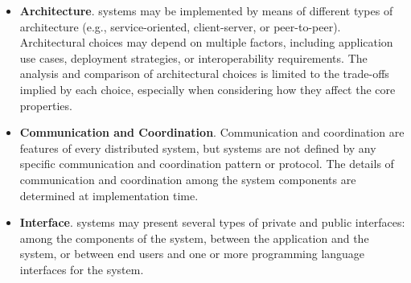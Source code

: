 \documentclass{sig-alternate}
\begin{document}
\begin{itemize}

\item \textbf{Architecture}. \pilot systems may be implemented by means of
  different types of architecture (e.g., service-oriented, client-server, or
  peer-to-peer). Architectural choices may depend on multiple factors, including
  application use cases, deployment strategies, or interoperability
  requirements.  The analysis and comparison of architectural choices is limited
  to the trade-offs implied by each choice, especially when considering how they
  affect the core properties.


    

\item \textbf{Communication and Coordination}. Communication and coordination
  are features of every distributed system, but \pilot systems are not defined
  by any specific communication and coordination pattern or protocol. The
  details of communication and coordination among the \pilot system components
  are determined at implementation time.




\item \textbf{Interface}. \pilot systems may present several types of private
  and public interfaces: among the components of the \pilot system, between the
  application and the \pilot system, or between end users and one or more
  programming language interfaces for the \pilot system.


\end{itemize}
\end{document}
